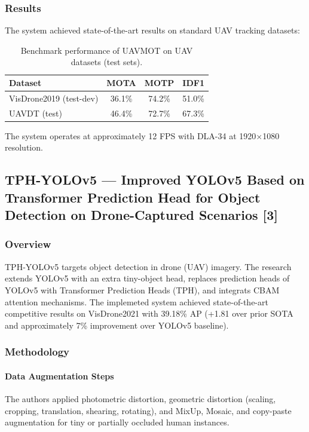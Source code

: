 \documentclass[12pt, a4paper]{report}
\begin{document}
\subsubsection{Results}
The system achieved state-of-the-art results on standard UAV tracking datasets:

\begin{table}[h]
\centering
\caption{Benchmark performance of UAVMOT on UAV datasets (test sets).}
\begin{tabular}{lccc}
\toprule
\textbf{Dataset} & \textbf{MOTA} & \textbf{MOTP} & \textbf{IDF1} \\
\midrule
VisDrone2019 (test-dev) & 36.1\% & 74.2\% & 51.0\% \\
UAVDT (test)            & 46.4\% & 72.7\% & 67.3\% \\
\bottomrule
\end{tabular}
\end{table}

The system operates at approximately 12 FPS with DLA-34 at 1920×1080 resolution.

\subsection{TPH-YOLOv5 — Improved YOLOv5 Based on Transformer Prediction Head for Object Detection on Drone-Captured Scenarios [3]}

\subsubsection{Overview}
TPH-YOLOv5 targets object detection in drone (UAV) imagery. The research extends YOLOv5 with an extra tiny-object head, replaces prediction heads of YOLOv5 with Transformer Prediction Heads (TPH), and integrats CBAM attention mechanisms. The implemeted system achieved state-of-the-art competitive results on VisDrone2021 with 39.18\% AP (+1.81 over prior SOTA and approximately 7\% improvement over YOLOv5 baseline).

\subsubsection{Methodology}

\paragraph{Data Augmentation Steps}
The authors applied photometric distortion, geometric distortion (scaling, cropping, translation, shearing, rotating), and MixUp, Mosaic, and copy-paste augmentation for tiny or partially occluded human instances.
\end{document}
